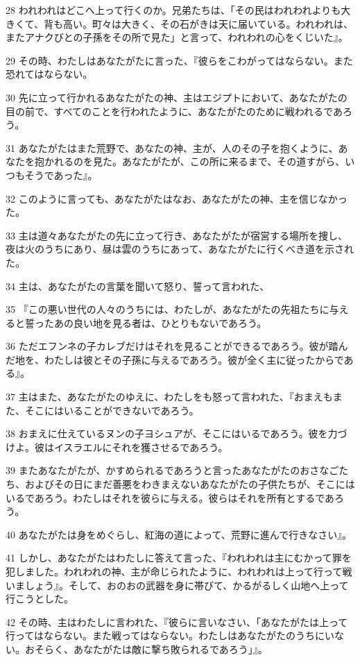 \par 28 われわれはどこへ上って行くのか。兄弟たちは、「その民はわれわれよりも大きくて、背も高い。町々は大きく、その石がきは天に届いている。われわれは、またアナクびとの子孫をその所で見た」と言って、われわれの心をくじいた』。
\par 29 その時、わたしはあなたがたに言った、『彼らをこわがってはならない。また恐れてはならない。
\par 30 先に立って行かれるあなたがたの神、主はエジプトにおいて、あなたがたの目の前で、すべてのことを行われたように、あなたがたのために戦われるであろう。
\par 31 あなたがたはまた荒野で、あなたの神、主が、人のその子を抱くように、あなたを抱かれるのを見た。あなたがたが、この所に来るまで、その道すがら、いつもそうであった』。
\par 32 このように言っても、あなたがたはなお、あなたがたの神、主を信じなかった。
\par 33 主は道々あなたがたの先に立って行き、あなたがたが宿営する場所を捜し、夜は火のうちにあり、昼は雲のうちにあって、あなたがたに行くべき道を示された。
\par 34 主は、あなたがたの言葉を聞いて怒り、誓って言われた、
\par 35 『この悪い世代の人々のうちには、わたしが、あなたがたの先祖たちに与えると誓ったあの良い地を見る者は、ひとりもないであろう。
\par 36 ただエフンネの子カレブだけはそれを見ることができるであろう。彼が踏んだ地を、わたしは彼とその子孫に与えるであろう。彼が全く主に従ったからである』。
\par 37 主はまた、あなたがたのゆえに、わたしをも怒って言われた、『おまえもまた、そこにはいることができないであろう。
\par 38 おまえに仕えているヌンの子ヨシュアが、そこにはいるであろう。彼を力づけよ。彼はイスラエルにそれを獲させるであろう。
\par 39 またあなたがたが、かすめられるであろうと言ったあなたがたのおさなごたち、およびその日にまだ善悪をわきまえないあなたがたの子供たちが、そこにはいるであろう。わたしはそれを彼らに与える。彼らはそれを所有とするであろう。
\par 40 あなたがたは身をめぐらし、紅海の道によって、荒野に進んで行きなさい』。
\par 41 しかし、あなたがたはわたしに答えて言った、『われわれは主にむかって罪を犯しました。われわれの神、主が命じられたように、われわれは上って行って戦いましょう』。そして、おのおの武器を身に帯びて、かるがるしく山地へ上って行こうとした。
\par 42 その時、主はわたしに言われた、『彼らに言いなさい、「あなたがたは上って行ってはならない。また戦ってはならない。わたしはあなたがたのうちにいない。おそらく、あなたがたは敵に撃ち敗られるであろう」』。
